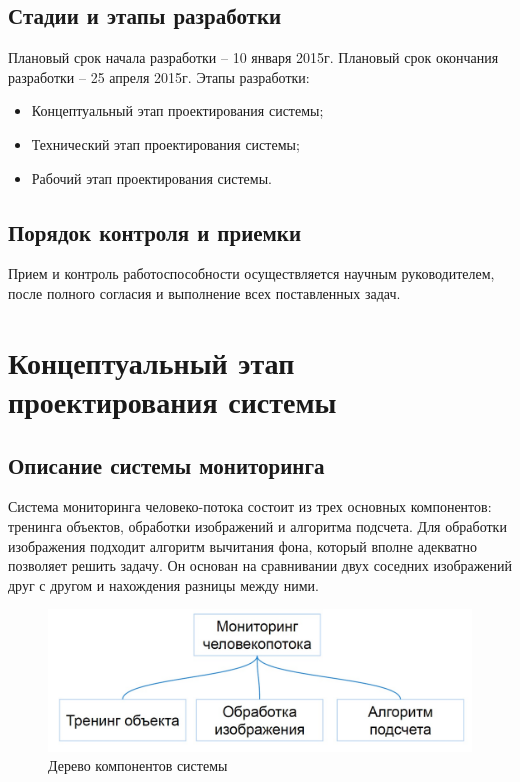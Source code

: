 \documentclass[12pt]{article}
\begin{document}
				\subsection{Стадии и этапы разработки }
Плановый срок начала разработки – 10 января 2015г.
Плановый срок окончания разработки – 25 апреля 2015г.
Этапы разработки:
\begin{itemize}
	\item Концептуальный этап проектирования системы;
	\item Технический этап проектирования системы;
	\item Рабочий этап проектирования системы.
\end{itemize}
	\subsection{Порядок контроля и приемки}
	Прием и контроль работоспособности осуществляется научным руководителем, после полного согласия и выполнение всех поставленных задач.

\newpage

	\section{Концептуальный этап проектирования системы}
		\subsection{Описание системы мониторинга}
		
Система мониторинга человеко-потока состоит из трех основных компонентов: тренинга объектов, обработки изображений и алгоритма подсчета. Для обработки изображения подходит алгоритм вычитания фона, который вполне адекватно позволяет решить задачу. Он основан на сравнивании двух соседних изображений друг с другом и нахождения разницы между ними.
		\begin{figure}[h!]
			\centering
			\includegraphics[width=1\textwidth]{pic/conc.jpg}
			\caption{Дерево компонентов системы}
		\end{figure}		
\end{document}
